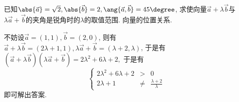 \documentclass[8pt]{article}
\begin{document}
		\begin{easonproblem}
			已知\(\abs{\vec{a}} = \sqrt{2}, \abs{\vec{b}}=2, \ang{\vec{a}, \vec{b}} = 45\degree\), 求使向量\(\vec{a} + \lambda \vec{b}\)与\(\lambda \vec{a} + \vec{b}\)的夹角是锐角时的\(\lambda\)的取值范围.
			\subproblem
			 向量的位置关系.

			不妨设\(\vec{a} = (1, 1), \vec{b} = (2, 0)\), 则有\(\vec{a} + \lambda \vec{b} = (2\lambda + 1, 1), \lambda \vec{a} + \vec{b} = (\lambda + 2, \lambda)\), 于是有\(\left(\vec{a} + \lambda \vec{b}\right)\left(\lambda \vec{a} + \vec{b}\right) = 2 \lambda^2 + 6\lambda + 2,\) 于是有
			\begin{displaymath}
				\left\{
					\begin{array}{rcl}
						2\lambda^2 + 6 \lambda + 2 &>& 0\\
						2\lambda + 1 &\neq& \frac{\lambda+2}{\lambda}
					\end{array}
				\right.
			\end{displaymath}
			即可解出答案.
		\end{easonproblem}
\end{document}
